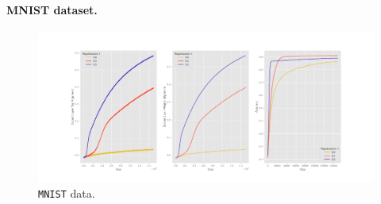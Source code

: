 



\paragraph{MNIST dataset.}

\begin{figure}[t]
  \centering
  \includegraphics[width=\linewidth]{figures/mnist_2l_v2_horizontal.pdf}
  \caption{\texttt{MNIST} data.}
  \label{fig:mnist}
\end{figure}